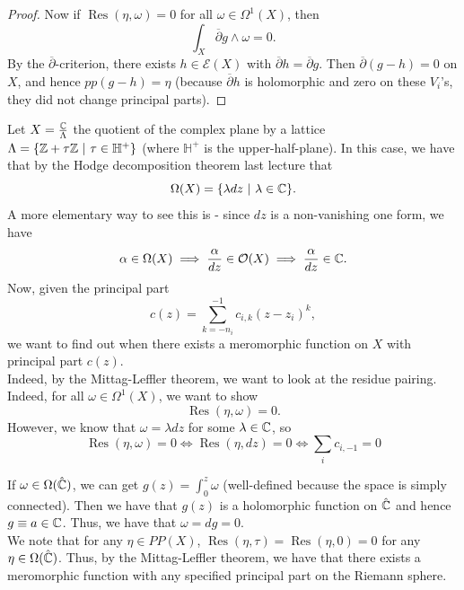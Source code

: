 \documentclass{article}
\begin{document}
{\begin{proof}
    Now if $\operatorname{Res}(\eta, \omega) = 0$ for all $\omega \in \Omega^{1}(X)$, then 
    \[\int_X \overline{\partial} g \wedge \omega = 0.\]
    By the $\overline{\partial}$-criterion, there exists $h \in \mathcal{E}(X)$ with $\overline{\partial} h = \overline{\partial} g$. Then $\overline{\partial}(g - h) = 0$ on $X$, and hence $pp(g - h) = \eta$ (because $\overline{\partial} h$ is holomorphic and zero on these $V_i$'s, they did not change principal parts).
\end{proof}

\begin{example}
Let $X = \frac{\mathbb{C}}{\Lambda}$ the quotient of the complex plane by a lattice $\Lambda = \{\mathbb{Z} + \tau \mathbb{Z}\ |\ \tau \in \mathbb{H}^+ \}$ (where $\mathbb{H}^+$ is the upper-half-plane). In this case, we have that by the Hodge decomposition theorem last lecture that
\[\Omega(X) = \{\lambda dz\ |\ \lambda \in \mathbb{C}\}.\]
A more elementary way to see this is - since $dz$ is a non-vanishing one form, we have 
\[\alpha \in \Omega(X) \implies \frac{\alpha}{dz} \in \mathcal{O}(X) \implies \frac{\alpha}{dz} \in \mathbb{C}.\]
Now, given the principal part
\[c(z) = \sum_{k = -n_i}^{-1} c_{i, k} (z - z_i)^k,\]
we want to find out when there exists a meromorphic function on $X$ with principal part $c(z)$.\\

Indeed, by the Mittag-Leffler theorem, we want to look at the residue pairing. Indeed, for all $\omega \in \Omega^1(X)$, we want to show
\[\operatorname{Res}(\eta, \omega) = 0.\]
However, we know that $\omega = \lambda dz$ for some $\lambda \in \mathbb{C}$, so
\[\operatorname{Res}(\eta, \omega) = 0 \iff \operatorname{Res}(\eta, dz) = 0 \iff \sum_{i} c_{i, -1} = 0\]
\end{example}

\begin{example}
    If $\omega \in \Omega(\hat{\mathbb{C}})$, we can get $g(z) = \int_0^z \omega$ (well-defined because the space is simply connected). Then we have that $g(z)$ is a holomorphic function on $\hat{\mathbb{C}}$ and hence $g \equiv a \in \mathbb{C}$. Thus, we have that $\omega = dg = 0$.\\

    We note that for any $\eta \in PP(X)$, $\operatorname{Res}(\eta, \tau) = \operatorname{Res}(\eta, 0) = 0$ for any $\eta \in \Omega(\hat{\mathbb{C}})$. Thus, by the Mittag-Leffler theorem, we have that there exists a meromorphic function with any specified principal part on the Riemann sphere.
\end{example}

}
\end{document}
